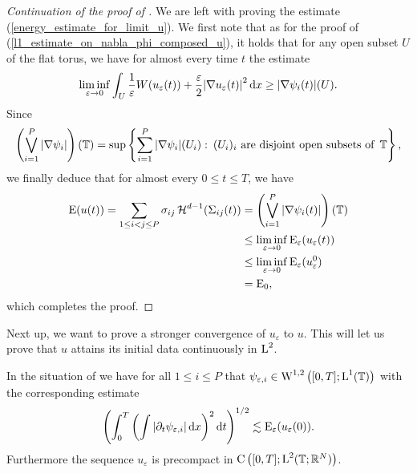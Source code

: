 \begin{proof}[Continuation of the proof of 
]
	We are left with proving the estimate (\ref{energy_estimate_for_limit_u}). We first note that as for the proof of (\ref{l1_estimate_on_nabla_phi_composed_u}), it holds that for any open subset $ U $ of the flat torus, we have for almost every time $ t $ the estimate
	\begin{equation*}
		\liminf_{ \varepsilon \to 0 } 
			\int_{ U }
				\frac{ 1 }{ \varepsilon }
				W ( u_{ \varepsilon } ( t )  )
				+
				\frac{ \varepsilon }{ 2 }
				\abs{ \nabla u_{ \varepsilon } ( t ) }^{ 2 }
			\dd{ x }
		\geq
		\abs{ \nabla \psi_{ i } ( t ) } ( U ).
	\end{equation*}
	Since
	\begin{equation*}
		\left(
		\bigvee_{ i = 1 }^{ P }
			\abs{ \nabla \psi_{ i } } 
		\right) 
		( \operatorname{\mathbb{T}} )
		=
		\sup \left\{
			\sum_{ i = 1 }^{ P }
				\abs{ \nabla \psi_{ i } } ( U_{ i } )
			\, \colon \,
			( U_{ i } )_{ i } \text{ are disjoint open subsets of } \operatorname{\mathbb{T}}
		\right\},
	\end{equation*}
	we finally deduce that for almost every $ 0 \leq t \leq T $, we have
	\begin{align*}
		\operatorname{E} ( u ( t ) )
		=
		\sum_{ 1 \leq i < j \leq P }
			\sigma_{ i j }
			\operatorname{\mathcal{H}}^{ d - 1 } ( \Sigma_{ i j } ( t ) )
		& =
		\left(
			\bigvee_{ i = 1 }^{ P }
				\abs{ \nabla \psi_{ i } ( t ) }
		\right) ( \operatorname{\mathbb{T}} )
		\\
		& \leq
		\liminf_{ \varepsilon \to 0 }
			\operatorname{E}_{ \varepsilon } ( u_{ \varepsilon } ( t ) )
		\\
		&\leq
		\liminf_{ \varepsilon \to 0 } 
			\operatorname{E}_{ \varepsilon } ( u_{ \varepsilon }^{ 0 } )
		\\
		& =
		\operatorname{E}_{ 0 },
	\end{align*}
	which completes the proof.
\end{proof}

Next up, we want to prove a stronger convergence of $ u_{ \varepsilon } $ to $ 
u 
$. This will let us prove that $ u $ attains its initial data continuously in 
$ \operatorname{L}^{ 2 } $.

\begin{lemma}
	\label{continuity_in_l2_and_initial_data_multiphase}
	In the situation of  we have 
	for all $ 1 \leq i \leq P $ that
	$ \psi_{ \varepsilon , i } \in \operatorname{W}^{ 1 , 2 } \left(
		[ 0 , T ] ; \operatorname{L}^{ 1 } ( \operatorname{\mathbb{T}} )
	\right)
	$
	with the corresponding estimate
	\begin{equation}
		\label{l2_estimate_on_partial_t_psi_i}
		\left(
			\int_{ 0 }^{ T }
				\left(
					\int
						\abs{ \partial_{ t } \psi_{ \varepsilon , i } }
					\dd{ x }
				\right)^{ 2 }
			\dd{ t }
		\right)^{ 1/2 }
		\lesssim
		\operatorname{E}_{ \varepsilon } ( u_{ \varepsilon }( 0 ) ).
	\end{equation}
	Furthermore the sequence $ u_{ \varepsilon } $ is precompact in 
	$ \operatorname{C} \left(
		[ 0 , T ] ; \operatorname{L}^{ 2 } ( \operatorname{\mathbb{T}} ; \mathbb{ R }^{ N } )
	\right) $.
\end{lemma}


